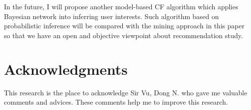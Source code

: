 \documentclass[10pt]{article}
\begin{document}
In the future, I will propose another model-based CF algorithm which applies Bayesian network into inferring user interests. Such algorithm based on probabilistic inference will be compared with the mining approach in this paper so that we have an open and objective viewpoint about recommendation study.

\section*{Acknowledgments}
This research is the place to acknowledge Sir Vu, Dong N. who gave me valuable comments and advices. These comments help me to improve this research.



\end{document}
